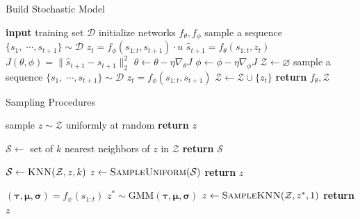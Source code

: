 \documentclass{article}
\begin{document}
\begin{minipage}[t]{7cm}
  \vspace{0pt}

  \begin{algorithm}[H]
    \caption{Build Stochastic Model}
    \begin{algorithmic}[1]
      \State \textbf{input} training set $\mathcal{D}$
      \State initialize networks $f_\theta, f_\phi$
      \State sample a sequence $\{s_1, \;\cdots, s_{t+1}\} \sim \mathcal{D}$
      \State $z_t = f_{\phi}(s_{1:t}, s_{t+1}) \cdot u$
      \State $\hat{s}_{t+1} = f_{\theta}(s_{1:t}, z_t)$
      \State $J(\theta, \phi) = \|\hat{s}_{t+1} - s_{t+1} \|_2^2$
      \State $\theta \leftarrow \theta - \eta \nabla_\theta J$
      \State $\phi \leftarrow \phi - \eta \nabla_\phi J$
      \EndWhile
      \State $\mathcal{Z} \leftarrow \varnothing$
      \State sample a sequence $\{s_1, \;\cdots, s_{t+1}\} \sim \mathcal{D}$
      \State $z_t = f_{\phi}(s_{1:t}, s_{t+1})$
      \State $\mathcal{Z} \leftarrow \mathcal{Z} \cup \{ z_t \}$
      \EndFor
      \State \textbf{return} $f_\theta, \mathcal{Z}$
    \end{algorithmic}
  \end{algorithm}
\end{minipage}%
\begin{minipage}[t]{7cm}
  \vspace{0pt}

  \begin{algorithm}[H]
    \caption{Sampling Procedures}\label{algo-sample}
    \begin{algorithmic}[1]
      \State sample $z \sim \mathcal{Z}$ uniformly at random
      \State \textbf{return} $z$
      \EndProcedure

      \State $\mathcal{S} \gets $ set of $k$ nearest neighbors of $z$ in $\mathcal{Z}$
      \State \textbf{return} $\mathcal{S}$
      \EndProcedure

      \State $\mathcal{S} \gets \textsc{KNN}(\mathcal{Z}, z, k)$
      \State $z \gets \textsc{SampleUniform}(\mathcal{S})$
      \State \textbf{return} $z$
      \EndProcedure

      \State $(\bm{\tau}, \bm{\mu}, \bm{\sigma}) = f_\psi(s_{1:t})$
      \State $z^* \sim \mbox{GMM}(\bm{\tau}, \bm{\mu}, \bm{\sigma})$
      \State $z \gets \textsc{SampleKNN}(\mathcal{Z}, z^*, 1)$
      \State \textbf{return} $z$
      \EndProcedure
    \end{algorithmic}
    \vspace{5.7pt}
  \end{algorithm}
\end{minipage}
\end{document}
